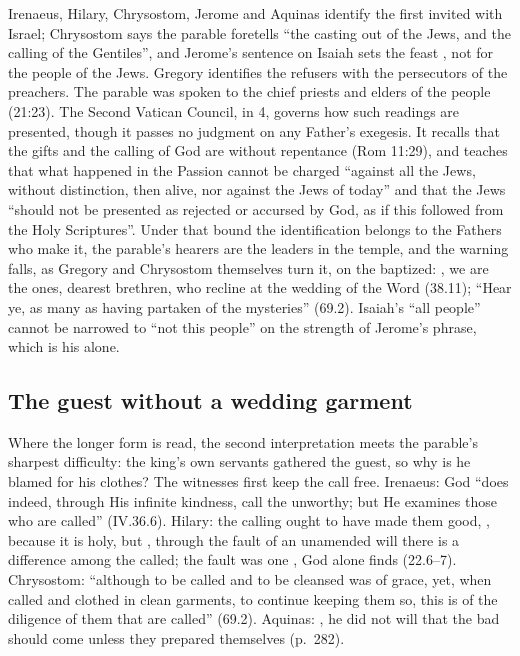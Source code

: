 Irenaeus, Hilary, Chrysostom, Jerome and Aquinas identify the first invited
with Israel; Chrysostom says the parable foretells ``the casting out of the
Jews, and the calling of the Gentiles'', and Jerome's sentence on Isaiah sets
the feast , not for the people of the Jews.
Gregory identifies the refusers with the persecutors of the preachers. The
parable was spoken to the chief priests and elders of the people (21:23). The
Second Vatican Council, in  4, governs
how such readings are presented, though it passes no judgment on any Father's
exegesis. It recalls that the gifts and the calling of God are without
repentance (Rom 11:29), and teaches that what happened in the Passion cannot
be charged ``against all the Jews, without distinction, then alive, nor
against the Jews of today'' and that the Jews ``should not be presented as
rejected or accursed by God, as if this followed from the Holy Scriptures''.
Under that bound the identification belongs to the Fathers who make it, the
parable's hearers are the leaders in the temple, and the warning falls, as
Gregory and Chrysostom themselves turn it, on the baptized: , we are the ones, dearest
brethren, who recline at the wedding of the Word (38.11); ``Hear ye, as many
as having partaken of the mysteries'' (69.2). Isaiah's ``all people'' cannot be
narrowed to ``not this people'' on the strength of Jerome's phrase, which is
his alone.

\subsection{The guest without a wedding garment}

Where the longer form is read, the second interpretation meets the parable's
sharpest difficulty: the king's own servants gathered the guest, so why is he
blamed for his clothes? The witnesses first keep the call free. Irenaeus: God ``does indeed, through His infinite kindness, call the
unworthy; but He examines those who are called'' (IV.36.6). Hilary: the
calling ought to have made them good, , because it is
holy, but ,
through the fault of an unamended will there is a difference among the
called; the fault was one , God alone finds (22.6--7).
Chrysostom: ``although to be called and to be cleansed was of grace, yet, when
called and clothed in clean garments, to continue keeping them so, this is of
the diligence of them that are called'' (69.2). Aquinas: , he did not will that the bad should come
unless they prepared themselves (p.~282).

